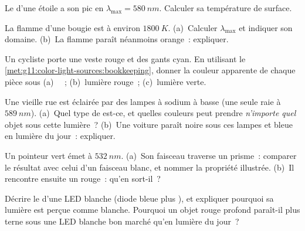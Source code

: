 \begin{exercise}[$\star$]\label{exo:g11:color-light-sources:5}
Le  d'une étoile a son pic en
$\lambda_{\max} = \qty{580}{nm}$. Calculer sa température de surface.
\end{exercise}

\begin{exercise}[$\star\star$]\label{exo:g11:color-light-sources:6}
La flamme d'une bougie est à environ $\qty{1800}{K}$. (a)~Calculer
$\lambda_{\max}$ et indiquer son domaine. (b)~La flamme paraît
néanmoins orange~: expliquer.
\end{exercise}

\begin{exercise}[$\star\star$]\label{exo:g11:color-light-sources:7}
Un cycliste porte une veste rouge et des gants cyan. En utilisant le
\cref{met:g11:color-light-sources:bookkeeping}, donner la couleur
apparente de chaque pièce sous (a)~
~; (b)~lumière rouge~;
(c)~lumière verte.
\end{exercise}

\begin{exercise}[$\star\star$]\label{exo:g11:color-light-sources:8}
Une vieille rue est éclairée par des lampes à sodium à
basse  (une seule raie à
$\qty{589}{nm}$). (a)~Quel type de 
est-ce, et quelles couleurs peut prendre \emph{n'importe quel} objet
sous cette lumière~? (b)~Une voiture paraît noire sous ces lampes et
bleue en lumière du jour~: expliquer.
\end{exercise}

\begin{exercise}[$\star\star$]\label{exo:g11:color-light-sources:9}
Un pointeur  vert émet à $\qty{532}{nm}$.
(a)~Son faisceau traverse un prisme~: comparer le résultat avec celui
d'un faisceau blanc, et nommer la propriété illustrée. (b)~Il rencontre
ensuite un  rouge~: qu'en sort-il~?
\end{exercise}

\begin{exercise}[$\star\star$]\label{exo:g11:color-light-sources:10}
Décrire le  d'une LED blanche (diode bleue plus
), et expliquer pourquoi sa lumière est
perçue comme blanche. Pourquoi un objet rouge profond paraît-il plus
terne sous une LED blanche bon marché qu'en lumière du jour~?
\end{exercise}

